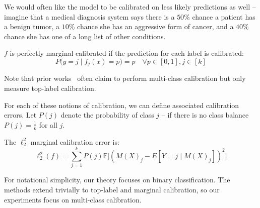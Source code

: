 We would often like the model to be calibrated on less likely predictions as well -- imagine that a medical diagnosis system says there is a $50\%$ chance a patient has a benign tumor, a $10\%$ chance she has an aggressive form of cancer, and a $40\%$ chance she has one of a long list of other conditions.

\begin{definition}
$f$ is perfectly marginal-calibrated if the prediction for each label is calibrated:
\[ P\Big(y = j \; | \; f_j(x) = p\Big) = p \quad \forall p \in [0, 1], j \in [k] \]
\end{definition}

Note that prior works~\cite{guo2017calibration, hendrycks2019anomaly, hendrycks2019pretraining} often claim to perform multi-class calibration but only measure top-label calibration.

For each of these notions of calibration, we can define associated calibration errors.
Let $P(j)$ denote the probability of class $j$ -- if there is no class balance $P(j) = \frac{1}{k}$ for all $j$. 

\begin{definition}
\label{dfn:marginal-ce}
The $\ell_2^2$ marginal calibration error is:
\[ \ell_2^2(f) = \sum_{j = 1}^k P(j) \mathbb{E}\big[ (M(X)_j - E[Y = j \; | \; M(X)_j])^2 \big] \]
\end{definition}


For notational simplicity, our theory focuses on binary classification.
The methods extend trivially to top-label and marginal calibration, so our experiments focus on multi-class calibration.

